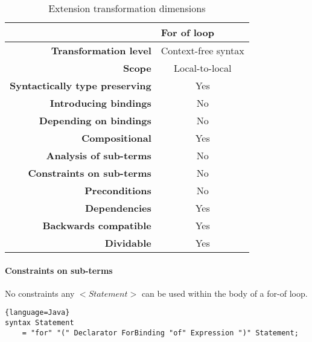 \documentclass[10pt,a4paper]{article}
\begin{document}
\begin{table}[H]
\centering
\caption{Extension transformation dimensions}
\label{for-of-table}
\begin{tabular}{@{}rc@{}}
\toprule
                                       & \multicolumn{1}{l}{\textbf{For of loop}} \\ \midrule
\textbf{Transformation level}          & Context-free syntax                          \\
\textbf{Scope}                         & Local-to-local                               \\
\textbf{Syntactically type preserving} & Yes                                          \\
\textbf{Introducing bindings}          & No                                          \\%
\textbf{Depending on bindings}         & No                                           \\
\textbf{Compositional}                 & Yes                                          \\
\textbf{Analysis of sub-terms}          & No                                          \\
\textbf{Constraints on sub-terms}       & No                                           \\
\textbf{Preconditions}                 & No                                          \\
\textbf{Dependencies}                  & Yes                                           \\
\textbf{Backwards compatible}          & Yes                                          \\
\textbf{Dividable}                     & Yes                                           \\ \bottomrule
\end{tabular}
\end{table}

\paragraph{Constraints on sub-terms}
No constraints any $<Statement>$ can be used within the body of a for-of loop.

\begin{lstlisting}{language=Java}
syntax Statement 
	= "for" "(" Declarator ForBinding "of" Expression ")" Statement;
\end{lstlisting}
    
\end{document}
